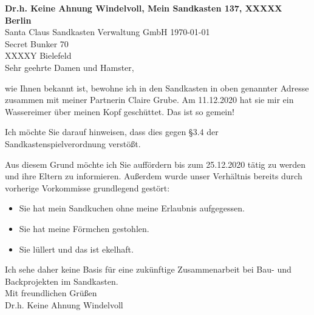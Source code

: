 \documentclass[12pt]{article}
\begin{document}
{\bf \tiny Dr.h. Keine Ahnung Windelvoll, Mein Sandkasten 137, XXXXX Berlin} \\
Santa Claus Sandkasten Verwaltung GmbH \hfill {\today}\\
Secret Bunker 70 \\
XXXXY Bielefeld\\[3.5em]

Sehr geehrte Damen und Hamster,

wie Ihnen bekannt ist, bewohne ich in den Sandkasten in oben genannter Adresse zusammen mit meiner Partnerin Claire Grube.
Am 11.12.2020 hat sie mir ein Wassereimer \"uber meinen Kopf gesch\"uttet. Das ist so gemein!

Ich möchte Sie darauf hinweisen, dass dies gegen \S \phantom{a}3.4 der Sandkastenspielverordnung verst\"o{\ss}t.

Aus diesem Grund m\"ochte ich Sie auff\"ordern bis zum 25.12.2020 t\"atig zu werden und ihre Eltern zu informieren.
Au{\ss}erdem wurde unser Verh\"altnis bereits durch vorherige Vorkommisse grundlegend gest\"ort:
\begin{itemize}
\item Sie hat mein Sandkuchen ohne meine Erlaubnis aufgegessen.
\item Sie hat meine F\"ormchen gestohlen.
\item Sie l\"ullert und das ist ekelhaft.
\end{itemize}
Ich sehe daher keine Basis f\"ur eine zuk\"unftige Zusammenarbeit bei Bau- und Backprojekten im Sandkasten. \\[2.5em]

Mit freundlichen Gr\"u{\ss}en\\[1.5em]
Dr.h. Keine Ahnung Windelvoll
\end{document}
